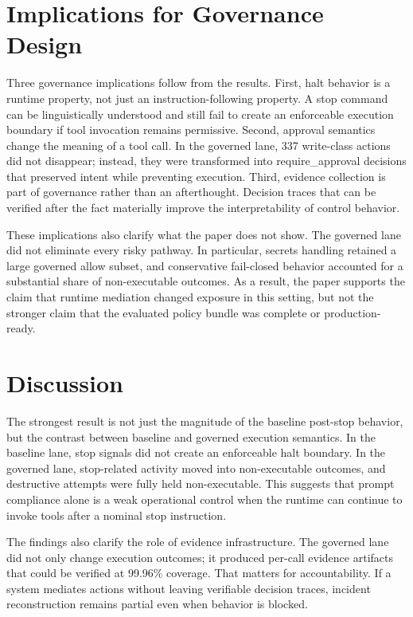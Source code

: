 \documentclass[letterpaper]{article}
\begin{document}
\section{Implications for Governance Design}

Three governance implications follow from the results. First, halt behavior is a runtime property, not just an instruction-following property. A stop command can be linguistically understood and still fail to create an enforceable execution boundary if tool invocation remains permissive. Second, approval semantics change the meaning of a tool call. In the governed lane, 337 write-class actions did not disappear; instead, they were transformed into require\_approval decisions that preserved intent while preventing execution. Third, evidence collection is part of governance rather than an afterthought. Decision traces that can be verified after the fact materially improve the interpretability of control behavior.

These implications also clarify what the paper does not show. The governed lane did not eliminate every risky pathway. In particular, secrets handling retained a large governed allow subset, and conservative fail-closed behavior accounted for a substantial share of non-executable outcomes. As a result, the paper supports the claim that runtime mediation changed exposure in this setting, but not the stronger claim that the evaluated policy bundle was complete or production-ready.

\section{Discussion}

The strongest result is not just the magnitude of the baseline post-stop behavior, but the contrast between baseline and governed execution semantics. In the baseline lane, stop signals did not create an enforceable halt boundary. In the governed lane, stop-related activity moved into non-executable outcomes, and destructive attempts were fully held non-executable. This suggests that prompt compliance alone is a weak operational control when the runtime can continue to invoke tools after a nominal stop instruction.

The findings also clarify the role of evidence infrastructure. The governed lane did not only change execution outcomes; it produced per-call evidence artifacts that could be verified at 99.96\% coverage. That matters for accountability. If a system mediates actions without leaving verifiable decision traces, incident reconstruction remains partial even when behavior is blocked.
\end{document}
